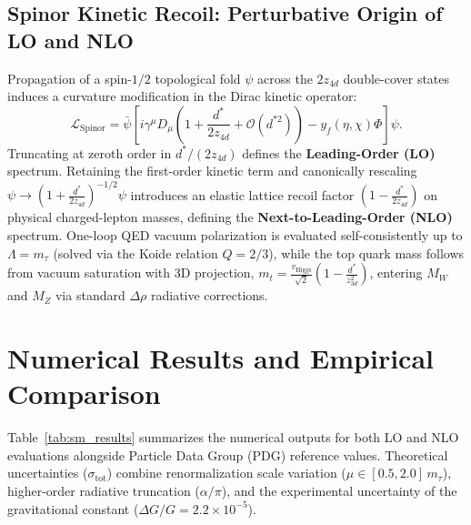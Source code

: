 \documentclass[11pt,a4paper]{article}
\begin{document}
\subsection{Spinor Kinetic Recoil: Perturbative Origin of LO and NLO}
Propagation of a spin-$1/2$ topological fold $\psi$ across the $2 z_{4d}$ double-cover states induces a curvature modification in the Dirac kinetic operator:
\begin{equation}
    \mathcal{L}_{\mathrm{Spinor}} = \bar{\psi}\left[ i\gamma^\mu D_\mu \left(1 + \frac{d^*}{2 z_{4d}} + \mathcal{O}(d^{*2})\right) - y_f(\eta, \chi)\Phi \right]\psi.
\end{equation}
Truncating at zeroth order in $d^*/(2z_{4d})$ defines the \textbf{Leading-Order (LO)} spectrum. Retaining the first-order kinetic term and canonically rescaling $\psi \to \left(1 + \frac{d^*}{2 z_{4d}}\right)^{-1/2}\psi$ introduces an elastic lattice recoil factor $\left(1 - \frac{d^*}{2 z_{4d}}\right)$ on physical charged-lepton masses, defining the \textbf{Next-to-Leading-Order (NLO)} spectrum. One-loop QED vacuum polarization is evaluated self-consistently up to $\Lambda = m_\tau$ (solved via the Koide relation $Q = 2/3$), while the top quark mass follows from vacuum saturation with 3D projection, $m_t = \frac{v_{\mathrm{Higgs}}}{\sqrt{2}}\left(1 - \frac{d^*}{z_{3d}^2}\right)$, entering $M_W$ and $M_Z$ via standard $\Delta\rho$ radiative corrections.

\section{Numerical Results and Empirical Comparison}

Table~\ref{tab:sm_results} summarizes the numerical outputs for both LO and NLO evaluations alongside Particle Data Group (PDG) reference values. Theoretical uncertainties ($\sigma_{\mathrm{tot}}$) combine renormalization scale variation ($\mu \in [0.5, 2.0]\,m_\tau$), higher-order radiative truncation ($\alpha/\pi$), and the experimental uncertainty of the gravitational constant ($\Delta G / G = 2.2 \times 10^{-5}$).
\end{document}
